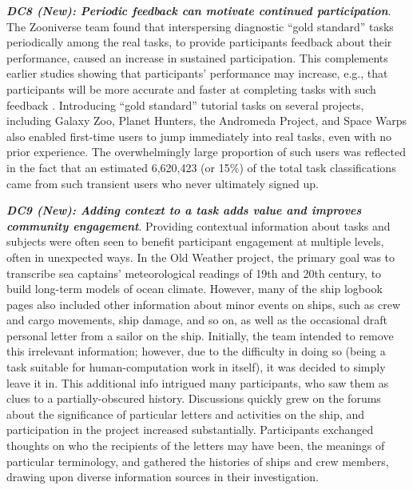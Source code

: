 \documentclass{sigchi}
\begin{document}
\begin{spacing}{0.97}



\textbf{\emph{DC8 (New): Periodic feedback can motivate continued participation}}. The Zooniverse team found that interspersing diagnostic ``gold standard'' tasks periodically among the real tasks, to provide participants feedback about their performance, caused an increase in sustained participation. This complements earlier studies showing that participants' performance may increase, e.g., that participants will be more accurate and faster at completing tasks with such feedback \cite{kluger1996effects}. Introducing ``gold standard'' tutorial tasks on several projects, including Galaxy Zoo, Planet Hunters, the Andromeda Project, and Space Warps also enabled first-time users to jump immediately into real tasks, even with no prior experience. The overwhelmingly large proportion of such users was reflected in the fact that an estimated 6,620,423 (or 15\%) of the total task classifications came from such transient users who never ultimately signed up. 

\textbf{\emph{DC9 (New): Adding context to a task adds value and improves community engagement}}. Providing contextual information about tasks and subjects were often seen to benefit participant engagement at multiple levels, often in unexpected ways. In the Old Weather project, the primary goal was to transcribe sea captains' meteorological readings of 19th and 20th century, to build long-term models of ocean climate. However, many of the ship logbook pages also included other information about minor events on ships, such as crew and cargo movements, ship damage, and so on, as well as the occasional draft personal letter from a sailor on the ship. Initially, the team intended to remove this irrelevant information; however, due to the difficulty in doing so (being a task suitable for human-computation work in itself), it was decided to simply leave it in. This additional info intrigued many participants, who saw them as clues to a partially-obscured history. Discussions quickly grew on the forums about the significance of particular letters and activities on the ship, and participation in the project increased substantially. Participants exchanged thoughts on who the recipients of the letters may have been, the meanings of particular terminology, and gathered the histories of ships and crew members, drawing upon diverse information sources in their investigation. 


\end{spacing}
\end{document}
